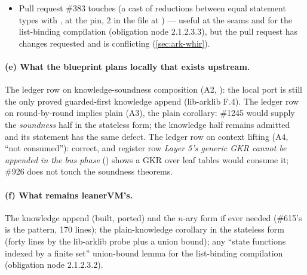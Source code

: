\begin{itemize}
  prover's queries leave behind.'' The pull request proves
   (with a full-transcript clause from
  every state) and  under
  \code{[Subsingleton σ]}, and exhibits the counterexample on a one-flag oracle.
  \textbf{Relevance to leanerVM}: the spine runs over  with  (a
  subsingleton), so the qualified form is exactly what the blueprint's ``plain corollary''
  (, the ledger row on round-by-round implies plain (A3)) needs; the
  \emph{knowledge} twin  is not in this
  pull request and carries the same fresh- defect (the lib-arklib probe
   proved the transcript-level half locally in forty lines).
\item Pull request \#383 touches  (a cast of reductions between
  equal statement types with ,  at the pin, 2
   in the file at ) --- useful at the seams and for the list-binding
  compilation (obligation node 2.1.2.3.3), but the pull request has changes requested and is
  conflicting (\cref{sec:ark-whir}).
\end{itemize}

\paragraph{(e) What the blueprint plans locally that exists upstream.}
The ledger row on knowledge-soundness composition (A2, ): the local port is still
the only proved guarded-first knowledge append (lib-arklib F.4). The ledger row on round-by-round
implies plain (A3), the plain corollary: \#1245 would supply the \emph{soundness} half in the
stateless form; the knowledge half remains admitted and its statement has the same defect. The
ledger row on context lifting (A4, ``not consumed''): correct, and register row \emph{Layer 5's
generic GKR cannot be appended in the bus phase} () shows a GKR over leaf tables would
consume it; \#926 does not touch the soundness theorems.

\paragraph{(f) What remains leanerVM's.}
The knowledge append (built, ported) and the $n$-ary form if ever needed (\#615's
 is the pattern, 170 lines); the plain-knowledge corollary in the
stateless form (forty lines by the lib-arklib probe plus a union bound); any ``state functions
indexed by a finite set'' union-bound lemma for the list-binding compilation (obligation node
2.1.2.3.2).

